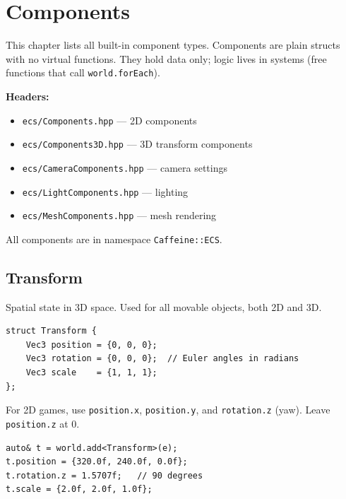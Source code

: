 \chapter{Components}

This chapter lists all built-in component types. Components are plain structs
with no virtual functions. They hold data only; logic lives in systems
(free functions that call \texttt{world.forEach}).

\textbf{Headers:}
\begin{itemize}[noitemsep]
  \item \texttt{ecs/Components.hpp} — 2D components
  \item \texttt{ecs/Components3D.hpp} — 3D transform components
  \item \texttt{ecs/CameraComponents.hpp} — camera settings
  \item \texttt{ecs/LightComponents.hpp} — lighting
  \item \texttt{ecs/MeshComponents.hpp} — mesh rendering
\end{itemize}

All components are in namespace \texttt{Caffeine::ECS}.

\section{Transform}

Spatial state in 3D space. Used for all movable objects, both 2D and 3D.

\begin{lstlisting}
struct Transform {
    Vec3 position = {0, 0, 0};
    Vec3 rotation = {0, 0, 0};  // Euler angles in radians
    Vec3 scale    = {1, 1, 1};
};
\end{lstlisting}

For 2D games, use \texttt{position.x}, \texttt{position.y}, and
\texttt{rotation.z} (yaw). Leave \texttt{position.z} at 0.

\begin{lstlisting}
auto& t = world.add<Transform>(e);
t.position = {320.0f, 240.0f, 0.0f};
t.rotation.z = 1.5707f;   // 90 degrees
t.scale = {2.0f, 2.0f, 1.0f};
\end{lstlisting}


